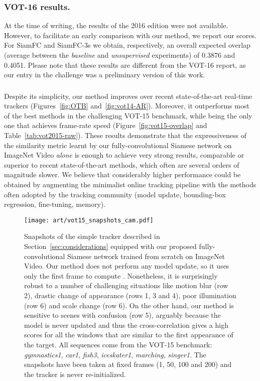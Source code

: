 \documentclass[runningheads]{llncs}
\begin{document}
\subsubsection{VOT-16 results.}
At the time of writing, the results of the 2016 edition were not available.
However, to facilitate an early comparison with our method, we report our scores.
For SiamFC and SiamFC-3s we obtain, respectively, an overall expected overlap (average between the \textit{baseline} and \textit{unsupervised} experiments) of 0.3876 and 0.4051.
Please note that these results are different from the VOT-16 report, as our entry in the challenge was a preliminary version of this work.


\subsubsection*{}Despite its simplicity, our method improves over recent state-of-the-art real-time trackers (Figures~\ref{fig:OTB} and~\ref{fig:vot14-AR}).
Moreover, it outperforms most of the best methods in the challenging VOT-15 benchmark, while being the only one that achieves frame-rate speed (Figure~\ref{fig:vot15-overlap} and Table~\ref{tab:vot2015-raw}).
These results demonstrate that the expressiveness of the similarity metric learnt by our fully-convolutional Siamese network on ImageNet Video \emph{alone} is enough to achieve very strong results, comparable or superior to recent state-of-the-art methods, which often are several orders of magnitude slower.
We believe that considerably higher performance could be obtained by augmenting the minimalist online tracking pipeline with the methods often adopted by the tracking community (\eg model update, bounding-box regression, fine-tuning, memory).


\begin{figure}[h]
\centering
\texttt{[image: art/vot15\_snapshots\_cam.pdf]}
\caption{Snapshots of the simple tracker described in Section~\ref{sec:considerations} equipped with our proposed fully-convolutional Siamese network trained from scratch on ImageNet Video.
Our method does not perform any model update, so it uses only the first frame to compute .
Nonetheless, it is surprisingly robust to a number of challenging situations like motion blur (row 2), drastic change of appearance (rows 1, 3 and 4), poor illumination (row 6) and scale change (row 6).
On the other hand, our method is sensitive to scenes with confusion (row 5), arguably because the model is never updated and thus the cross-correlation gives a high scores for all the windows that are similar to the first appearance of the target.
All sequences come from the VOT-15 benchmark: \emph{gymnastics1}, \emph{car1}, \emph{fish3}, \emph{iceskater1}, \emph{marching}, \emph{singer1}.
The snapshots have been taken at fixed frames (1, 50, 100 and 200) and the tracker is never re-initialized.}
\label{fig:tracking_snapshots}
\end{figure}
\end{document}
